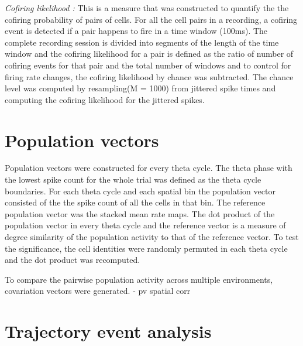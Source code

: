 \emph{Cofiring likelihood : } This is a measure that was constructed to quantify the the cofiring probability of pairs of cells. For all the cell pairs in a recording, a cofiring event is detected if a pair happens to fire in a time window (100ms). The complete recording session is divided into segments of the length of the time window and the cofiring likelihood for a pair is defined as the ratio of number of cofiring events for that pair and the total number of windows and to control for firing rate changes, the cofiring likelihood by chance was subtracted. The chance level was computed by resampling(M = 1000) from jittered spike times and computing the cofiring likelihood for the jittered spikes.

\section{Population vectors}
Population vectors were constructed for every theta cycle. The theta phase with the lowest spike count for the whole trial was defined as the theta cycle boundaries. For each theta cycle and each spatial bin the population vector consisted of the the spike count of all the cells in that bin. The reference population vector was the stacked mean rate maps. The dot product of the population vector in every theta cycle and the reference vector is a measure of degree similarity of the population activity to that of the reference vector. To test the significance, the cell identities were randomly permuted in each theta cycle and the dot product was recomputed. 

To compare the pairwise population activity across multiple environments, covariation vectors were generated. 
\cite{Gothard1996} - pv spatial corr 

\section{Trajectory event analysis}
